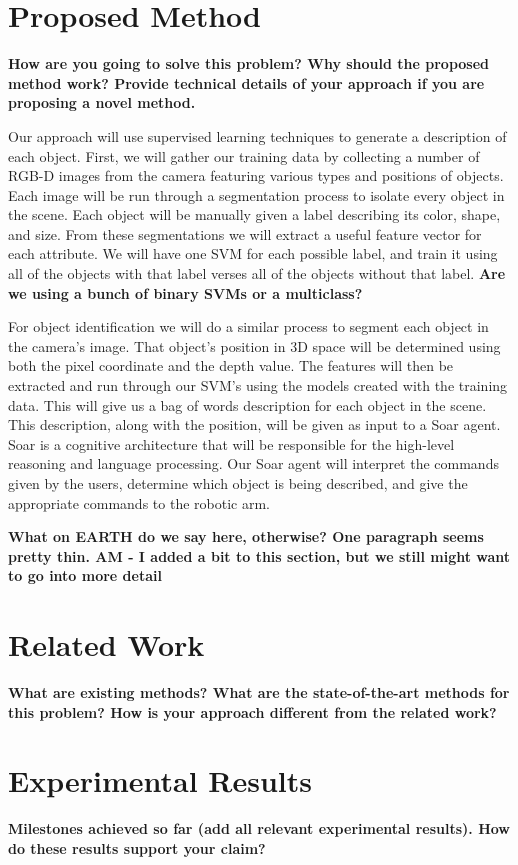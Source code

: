 \documentclass[11pt]{article}
\newcommand{\xxx}[1]{{\bf \color{red} #1}}
\newcommand{\meh}[1]{{\bf \color{blue} #1}}
\begin{document}
\section{Proposed Method}
\xxx{How are you going to solve this problem? Why should the proposed method
    work? Provide technical details of your approach if you are proposing a
    novel method.}

Our approach will use supervised learning techniques to generate a description of each object. First, we will gather our training data by collecting a number of RGB-D images from the camera featuring various types and positions of objects. Each image will be run through a segmentation process to isolate every object in the scene. Each object will be manually given a label describing its color, shape, and size. From these segmentations we will extract a useful feature vector for each attribute. We will have one SVM for each possible label, and train it using all of the objects with that label verses all of the objects without that label. \meh{Are we using a bunch of binary SVMs or a multiclass?}

For object identification we will do a similar process to segment each object in the camera's image. That object's position in 3D space will be determined using both the pixel coordinate and the depth value. The features will then be extracted and run through our SVM's using the models created with the training data. This will give us a bag of words description for each object in the scene. This description, along with the position, will be given as input to a Soar agent. Soar is a cognitive architecture that will be responsible for the high-level reasoning and language processing. Our Soar agent will interpret the commands given by the users, determine which object is being described, and give the appropriate commands to the robotic arm. 

\xxx{What on EARTH do we say here, otherwise? One paragraph seems pretty
    thin. AM - I added a bit to this section, but we still might want to go into more detail}

\section{Related Work}
\xxx{What are existing methods? What are the state-of-the-art methods for this
    problem? How is your approach different from the related work?}

\section{Experimental Results}
\xxx{Milestones achieved so far (add all relevant experimental results). How
    do these results support your claim?}
\end{document}
